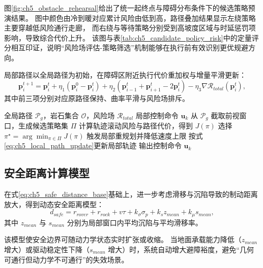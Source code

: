 \documentclass[UTF8,zihao=-4,a4paper,oneside,openany]{ctexrep}
\numberwithin{equation}{chapter}
\theoremstyle{plain}
\theoremstyle{definition}
\begin{document}
图\ref{fig:ch5_obstacle_rehearsal}给出了统一起终点与障碍分布条件下的候选策略预演结果。
图中颜色由冷到暖对应累计风险由低到高，路径叠加结果显示左绕策略主要穿越低风险通行走廊，
而右绕与等待策略分别受到高坡度区域与时延惩罚项影响，导致综合代价上升。
该图与表\ref{tab:ch5_candidate_policy_risk}中的定量评分相互印证，说明“风险场评估-策略筛选”机制能够在执行前有效识别更优规避方向。

局部路径以全局路径为初始，在障碍区附近执行代价重加权与增量平滑更新：
\begin{equation}
\mathbf{p}_{i}^{t+1}=\mathbf{p}_{i}^{t}
+\eta_1\left(\mathbf{p}_{i}^{0}-\mathbf{p}_{i}^{t}\right)
+\eta_2\left(\mathbf{p}_{i-1}^{t}+\mathbf{p}_{i+1}^{t}-2\mathbf{p}_{i}^{t}\right)
-\eta_3\nabla \mathcal{R}_{total}(\mathbf{p}_{i}^{t}),
\label{eq:ch5_local_path_update}
\end{equation}
其中前三项分别对应原路径保持、曲率平滑与风险场排斥。

\begin{algorithm}[H]
\caption{基于岩石识别的局部避障决策}
\label{alg:ch5_obstacle_avoidance}
\begin{algorithmic}[1]
\REQUIRE 全局路径 $\mathcal{P}_g$，岩石集合 $\mathcal{O}$，风险场 $\mathcal{R}_{total}$
\ENSURE 局部控制命令 $\mathbf{u}_k$
\STATE 从 $\mathcal{P}_g$ 截取前视窗口，生成候选策略集 $\Pi$
\FOR{$\pi\in\Pi$}
\STATE 计算轨迹滚动风险与路径代价，得到 $J(\pi)$
\ENDFOR
\STATE 选择 $\pi^\star=\arg\min_{\pi\in\Pi}J(\pi)$
\STATE 触发局部重规划并降低速度上限
\ENDIF
\STATE 按式\eqref{eq:ch5_local_path_update}更新局部轨迹
\STATE 输出控制命令 $\mathbf{u}_k$
\end{algorithmic}
\end{algorithm}

\subsection{安全距离计算模型}
\label{subsec:ch5_safe_distance_model}

在式\eqref{eq:ch5_safe_distance_base}基础上，进一步考虑滑移与沉陷导致的制动距离放大，得到动态安全距离模型：
\begin{equation}
d_{safe}=r_{rover}+r_{rock}+v\tau+k_\sigma \sigma_p+k_s z_{mean}+k_\mu s_{mean},
\label{eq:ch5_safe_distance_dynamic}
\end{equation}
其中 $z_{mean}$ 与 $s_{mean}$ 分别为局部窗口内平均沉陷与平均滑移率。

该模型使安全边界可随动力学状态实时扩张或收缩。
当地面承载能力降低（$z_{mean}$ 增大）或驱动稳定性下降（$s_{mean}$ 增大）时，系统自动增大避障裕度，避免“几何可通行但动力学不可通行”的失效场景。
\end{document}
